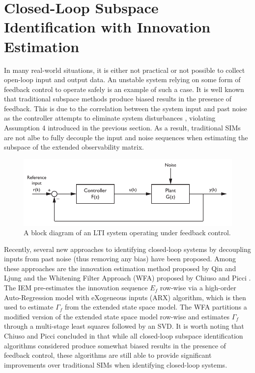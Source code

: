 \section{Closed-Loop Subspace Identification with Innovation Estimation}\label{sec:closed-loop_subspace_identification}
In many real-world situations, it is either not practical or not possible to collect open-loop input and output data. An unstable system relying on some form of feedback control to operate safely is an example of such a case. It is well known that traditional subspace methods produce biased results in the presence of feedback. This is due to the correlation between the system input and past noise as the controller attempts to eliminate system disturbances \cite{qin2006overview}, violating Assumption 4 introduced in the previous section. As a result, traditional SIMs are not albe to fully decouple the input and noise sequences when estimating the subspace of the extended observability matrix.
\begin{figure}[htb!]
	\centering
	\includegraphics{../fig/closed_loop_block_diagram.pdf}
	\caption{A block diagram of an LTI system operating under feedback control.}
\end{figure}

Recently, several new approaches to identifying closed-loop systems by decoupling inputs from past noise (thus removing any bias) have been proposed. Among these approaches are the innovation estimation method proposed by Qin and Ljung \cite{qin2003closed} and the Whitening Filter Approach (WFA) proposed by Chiuso and Picci \cite{chiuso2005consistency}. The IEM pre-estimates the innovation sequence $E_f$ row-wise via a high-order Auto-Regression model with eXogeneous inputs (ARX) algorithm, which is then used to estimate $\Gamma_f$ from the extended state space model. The WFA partitions a modified version of the extended state space model row-wise and estimates $\Gamma_f$ through a multi-stage least squares followed by an SVD. It is worth noting that Chiuso and Picci concluded in \cite{chiuso2005consistency} that while all closed-loop subspace identification algorithms considered produce somewhat biased results in the presence of feedback control, these algorithms are still able to provide significant improvements over traditional SIMs when identifying closed-loop systems.

